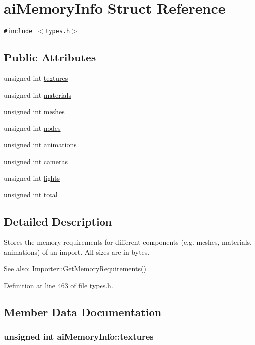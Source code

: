 \hypertarget{structai_memory_info}{
\section{aiMemoryInfo Struct Reference}
\label{structai_memory_info}
}
{\tt \#include $<$types.h$>$}

\subsection*{Public Attributes}
\begin{CompactItemize}
\item 
unsigned int \hyperlink{structai_memory_info_32817d13f0e280777e49769f8c46f168}{textures}
\item 
unsigned int \hyperlink{structai_memory_info_08b2ccd0cef8dec36e47fc1beeb168f1}{materials}
\item 
unsigned int \hyperlink{structai_memory_info_c24ed2b3c141f043765b6e34783d1e24}{meshes}
\item 
unsigned int \hyperlink{structai_memory_info_5a084942c81a29f7bb03c9903430b033}{nodes}
\item 
unsigned int \hyperlink{structai_memory_info_f82394dc3a17a644061ed647817efa68}{animations}
\item 
unsigned int \hyperlink{structai_memory_info_3ddd36d7eabcf989ab72cda2dd3ff015}{cameras}
\item 
unsigned int \hyperlink{structai_memory_info_fcd2ccdfab49e2fce989413a362b8d35}{lights}
\item 
unsigned int \hyperlink{structai_memory_info_590739a4cef4876901d1cf6ff48f01b3}{total}
\end{CompactItemize}


\subsection{Detailed Description}
Stores the memory requirements for different components (e.g. meshes, materials, animations) of an import. All sizes are in bytes. \begin{Desc}
\item[See also:]Importer::GetMemoryRequirements() \end{Desc}


Definition at line 463 of file types.h.

\subsection{Member Data Documentation}
\hypertarget{structai_memory_info_32817d13f0e280777e49769f8c46f168}{
\subsubsection[textures]{\setlength{\rightskip}{0pt plus 5cm}unsigned int {\bf aiMemoryInfo::textures}}}
\label{structai_memory_info_32817d13f0e280777e49769f8c46f168}


